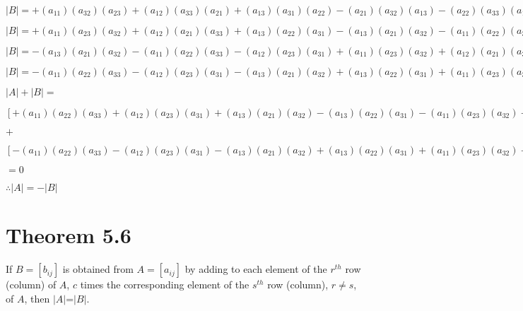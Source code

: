\documentclass{report}
\begin{document}
\begin{center}
$
	|B|=+(a_{11})(a_{32})(a_{23})+(a_{12})(a_{33})(a_{21})+(a_{13})(a_{31})(a_{22})
	-(a_{21})(a_{32})(a_{13})-(a_{22})(a_{33})(a_{11})-(a_{23})(a_{31})(a_{12})
$
\end{center}
\begin{center}
$
	|B|=+(a_{11})(a_{23})(a_{32})+(a_{12})(a_{21})(a_{33})+(a_{13})(a_{22})(a_{31})
	-(a_{13})(a_{21})(a_{32})-(a_{11})(a_{22})(a_{33})-(a_{12})(a_{23})(a_{31})
$
\end{center}
\begin{center}
$
	|B|=-(a_{13})(a_{21})(a_{32})-(a_{11})(a_{22})(a_{33})-(a_{12})(a_{23})(a_{31})
	+(a_{11})(a_{23})(a_{32})+(a_{12})(a_{21})(a_{33})+(a_{13})(a_{22})(a_{31})
$
\end{center}
\begin{center}
$
	|B|=-(a_{11})(a_{22})(a_{33})-(a_{12})(a_{23})(a_{31})-(a_{13})(a_{21})(a_{32})
	+(a_{13})(a_{22})(a_{31})+(a_{11})(a_{23})(a_{32})+(a_{12})(a_{21})(a_{33})
$
\end{center}
\vspace{10mm}
\begin{center}
$
|A|+|B|=
$
\end{center}
\vspace{-5mm}
\begin{center}
$
	[+(a_{11})(a_{22})(a_{33})+(a_{12})(a_{23})(a_{31})+(a_{13})(a_{21})(a_{32})
	-(a_{13})(a_{22})(a_{31})-(a_{11})(a_{23})(a_{32})-(a_{12})(a_{21})(a_{33})]
$
\end{center}
\vspace{-5mm}
\begin{center}
$ +$
\end{center}
\vspace{-5mm}
\begin{center}
$
	[-(a_{11})(a_{22})(a_{33})-(a_{12})(a_{23})(a_{31})-(a_{13})(a_{21})(a_{32})
	+(a_{13})(a_{22})(a_{31})+(a_{11})(a_{23})(a_{32})+(a_{12})(a_{21})(a_{33})]
$
\end{center}
\begin{center}
$
	=0
$
\end{center}

\vspace{-1mm}
\begin{center}
	$\therefore|A| = -|B|$ 
\end{center}








\pagebreak
\section*{Theorem 5.6}
If $B=[b_{ij}]$ is obtained from $A=[a_{ij}]$ by adding to each element of the $r^{th}$ row (column) of $A$, $c$  times the corresponding element of the $s^{th}$ row (column), $r \neq s$, of $A$, then $|A|$=$|B|$.
\end{document}
